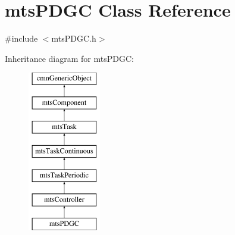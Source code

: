 \hypertarget{classmts_p_d_g_c}{}\section{mts\+P\+D\+G\+C Class Reference}
\label{classmts_p_d_g_c}


{\ttfamily \#include $<$mts\+P\+D\+G\+C.\+h$>$}

Inheritance diagram for mts\+P\+D\+G\+C\+:\begin{figure}[H]
\begin{center}
\leavevmode
\includegraphics[height=7.000000cm]{df/d52/classmts_p_d_g_c}
\end{center}
\end{figure}
